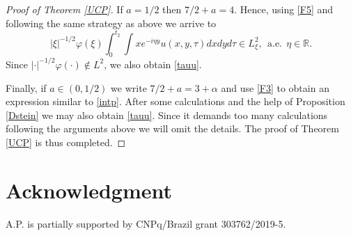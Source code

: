 \documentclass[reqno]{amsart}
\newcommand{\R}{\mathbb R}
\numberwithin{equation}{section}
\begin{document}
\begin{proof}[Proof of Theorem \ref{UCP}]
If $a=1/2$ then $7/2+a=4$. Hence, using \eqref{F5} and following the same strategy as above we arrive to
\begin{equation*}
|\xi|^{-1/2}\varphi(\xi) \int_{0}^{t_2}\int x e^{-i\eta y}u(x,y,\tau)dxdyd\tau \in L^2_\xi, \ \ \mbox{a.e.} \ \ \eta\in \R.
\end{equation*}
Since $|\cdot|^{-1/2}\varphi(\cdot)\notin L^2$, we also obtain \eqref{tauu}.

Finally, if $a\in (0,1/2)$ we write $7/2+a=3+\alpha$ and use \eqref{F3} to obtain an expression similar to \eqref{intp}. After some calculations and the help of Proposition \ref{Dstein} we may also obtain \eqref{tauu}. Since it demands too many calculations following the arguments above we will omit the details. The proof of Theorem \ref{UCP} is thus completed. 
\end{proof}



\section*{Acknowledgment}

A.P. is partially supported by CNPq/Brazil grant  	303762/2019-5.
\end{document}
